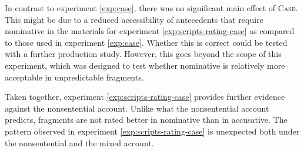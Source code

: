 In contrast to experiment \ref{exp:case}, there was no significant main effect of \textsc{Case}. This might be due to a reduced accessibility of antecedents that require nominative in the materials for experiment \ref{exp:scripts-rating-case} as compared to those used in experiment \ref{exp:case}. Whether this is correct could be tested with a further production study. However, this goes beyond the scope of this experiment, which was designed to test whether nominative is relatively more acceptable in unpredictable fragments.

Taken together, experiment \ref{exp:scripts-rating-case} provides further evidence against the nonsentential account. Unlike what the nonsentential account predicts, fragments are not rated better in nominative than in accusative. The pattern observed in experiment \ref{exp:scripts-rating-case} is unexpected both under the nonsentential and the mixed account.

